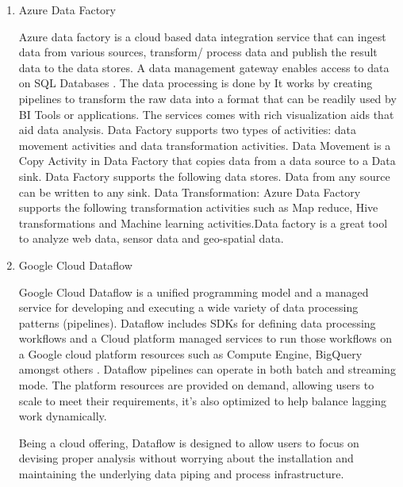\begin{enumerate}
\item {} 
Azure Data Factory

Azure data factory is a cloud based data integration service that
can ingest data from various sources, transform/ process data and
publish the result data to the data stores. A data management
gateway enables access to data on SQL Databases
\label{\detokenize{i524/technologies:id48}}{\hyperref[\detokenize{i524/technologies:www-jamesserra}]{\sphinxcrossref{{[}40{]}}}}. The data processing is done by It works by
creating pipelines to transform the raw data into a format that
can be readily used by BI Tools or applications. The services
comes with rich visualization aids that aid data analysis. Data
Factory supports two types of activities: data movement activities
and data transformation activities. Data Movement
\label{\detokenize{i524/technologies:id49}}{\hyperref[\detokenize{i524/technologies:www-microsoft-azure}]{\sphinxcrossref{{[}41{]}}}} is a Copy Activity in Data Factory
that copies data from a data source to a Data sink. Data Factory
supports the following data stores. Data from any source can be
written to any sink.  Data Transformation: Azure Data Factory
supports the following transformation activities such as Map
reduce, Hive transformations and Machine learning activities.Data
factory is a great tool to analyze web data, sensor data and
geo-spatial data.

\item {} 
Google Cloud Dataflow

Google Cloud Dataflow is a unified programming model and a managed
service for developing and executing a wide variety of data
processing patterns (pipelines). Dataflow includes SDKs for
defining data processing workflows and a Cloud platform managed
services to run those workflows on a Google cloud platform
resources such as Compute Engine, BigQuery amongst others
\label{\detokenize{i524/technologies:id50}}{\hyperref[\detokenize{i524/technologies:www-dataflow}]{\sphinxcrossref{{[}42{]}}}}. Dataflow pipelines can operate in both batch
and streaming mode. The platform resources are provided on demand,
allowing users to scale to meet their requirements, it’s also
optimized to help balance lagging work dynamically.

Being a cloud offering, Dataflow is designed to allow users to focus
on devising proper analysis without worrying about the installation
and maintaining \label{\detokenize{i524/technologies:id51}}{\hyperref[\detokenize{i524/technologies:www-googlelivestream}]{\sphinxcrossref{{[}43{]}}}} the underlying data
piping and process infrastructure.


\end{enumerate}

